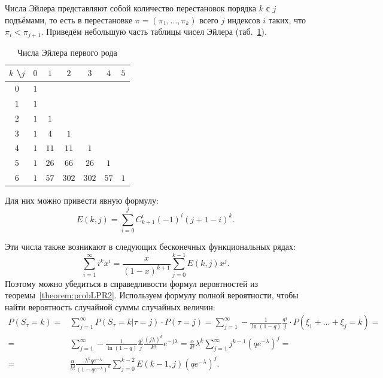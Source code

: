 \documentclass[12pt, specialist, subf, substylefile = spbu.rtx]{disser}
\begin{document}
	Числа Эйлера представляют собой количество перестановок порядка $k$ с $j$ подъёмами, то есть в перестановке $\pi = (\pi _1, \dots, \pi _k)$ всего $j$ индексов $i$ таких, что $\pi _i < \pi _{j + 1}$. Приведём небольшую часть таблицы чисел Эйлера (таб.~\ref{tab:eiler1}).

	\begin{table}[!ht]
		\centering
		\caption{Числа Эйлера первого рода}
		\begin{tabular}{c|cccccc}
			$k$ \textbackslash $j$ & $0$ & $1$ & $2$ & $3$ & $4$ & $5$\\ \hline
			$0$ & $1$ &  &  &  &  & \\
			$1$ & $1$ &  &  &  &  & \\
			$2$ & $1$ & $1$ &  &  &  & \\
			$3$ & $1$ & $4$ & $1$ &  &  & \\
			$4$ & $1$ & $11$ & $11$ & $1$ &  & \\
			$5$ & $1$ & $26$ & $66$ & $26$ & $1$ & \\
			$6$ & $1$ & $57$ & $302$ & $302$ & $57$ & $1$ \\
		\end{tabular}
		\label{tab:eiler1}
	\end{table}

	Для них можно привести явную формулу:
	\[
		E(k, j) = \sum \limits ^j _{i = 0} C ^i _{k + 1} (-1) ^i (j + 1 - i) ^k.
	\]

	Эти числа также возникают в следующих бесконечных функциональных рядах:
	\[
		\sum \limits ^\infty _{i = 1} i ^k x ^i = \frac {x} {(1 - x) ^{k + 1}} \sum \limits ^{k - 1} _{j = 0} E(k, j) x ^j.
	\]
	Поэтому можно убедиться в справедливости формул вероятностей из теоремы~\ref{theorem:probLPR2}. Используем формулу полной вероятности, чтобы найти вероятность случайной суммы случайных величин:
	\[
		\begin{aligned}
			P(S _\tau = k) =& \sum \limits ^{\infty} _{j = 1} P(\left.S _\tau = k\right| \tau = j) \cdot P(\tau = j) = \sum \limits ^{\infty} _{j = 1} - \frac 1 {\ln(1 - q)} \frac {q ^j} j \cdot P(\xi _1 + \dots + \xi _j = k) =\\
			=& \sum \limits ^{\infty} _{j = 1} - \frac 1 {\ln(1 - q)} \frac {q ^j} j \frac {(j \lambda) ^k} {k !} e ^{-j \lambda} = \frac \alpha {k !} \lambda ^k \sum \limits ^{\infty} _{j = 1} j ^{k - 1} \left(q e ^{-\lambda}\right) ^j =\\
			=& \frac \alpha {k !} \frac {\lambda ^k q e ^{-\lambda}} {\left(1 - q e ^{-\lambda}\right) ^k} \sum \limits ^{k - 2} _{j = 0} E(k - 1, j) \left(q e ^{-\lambda}\right) ^j.
		\end{aligned}
	\]
	
\end{document}
